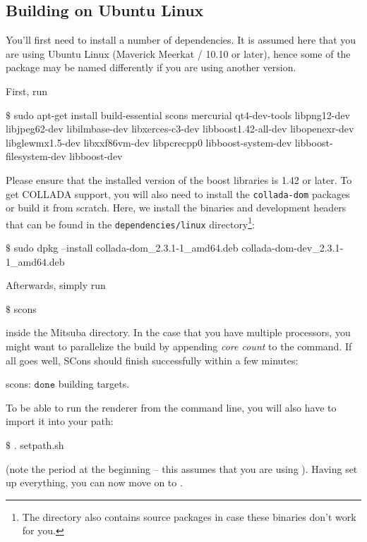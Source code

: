 \subsection{Building on Ubuntu Linux}
\label{sec:compiling-ubuntu}
You'll first need to install a number of dependencies. It is assumed here
that you are using Ubuntu Linux (Maverick Meerkat / 10.10 or later), hence some of the package may be named differently if you are 
using another version.

First, run
\begin{shell}
$\text{\$}$ sudo apt-get install build-essential scons mercurial qt4-dev-tools libpng12-dev 
    libjpeg62-dev libilmbase-dev libxerces-c3-dev libboost1.42-all-dev 
	libopenexr-dev libglewmx1.5-dev libxxf86vm-dev libpcrecpp0
	libboost-system-dev libboost-filesystem-dev libboost-dev
\end{shell}
Please ensure that the installed version of the boost libraries is 1.42 or later.
To get COLLADA support, you will also need to install the \texttt{collada-dom} packages or build it from scratch. Here, we install the  binaries and development headers that can be found in the \texttt{dependencies/linux} directory\footnote{The directory also contains source packages in case these binaries don't work for you.}:
\begin{shell}
$\text{\$}$ sudo dpkg --install collada-dom_2.3.1-1_amd64.deb collada-dom-dev_2.3.1-1_amd64.deb
\end{shell}
Afterwards, simply run
\begin{shell}
$\text{\$}$ scons
\end{shell}
inside the Mitsuba directory. In the case that you have multiple processors, you might want to parallelize the build by appending \emph{core count} to the command.
If all goes well, SCons should finish successfully within a few minutes:
\begin{shell}
scons: $\texttt{done}$ building targets.
\end{shell}
To be able to run the renderer from the command line, you will also have to import it into your path:
\begin{shell}
$\text{\$}$ . setpath.sh
\end{shell}
(note the period at the beginning -- this assumes that you are using ).
Having set up everything, you can now move on to .
